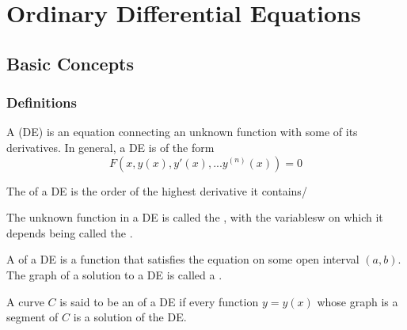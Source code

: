 \documentclass[12pt, a4paper, oneside, openright, titlepage]{book}
\begin{document}
\tableofcontents








\part{Ordinary Differential Equations}

\chapter{Basic Concepts}


\section{Definitions}

\begin{defn}
        A  (DE) is an equation connecting an unknown function with some of its derivatives. In general, a DE is of the form \begin{equation}
                F(x,y(x),y'(x),...y^{(n)}(x)) = 0
        \end{equation}
\end{defn}


\begin{defn}[Order]
        The  of a DE is the order of the highest derivative it contains/
\end{defn}



\begin{defn}
        The unknown function in a DE is called the , with the variablesw on which it depends being called the .
\end{defn}



\begin{defn}[Solution]
        A  of a DE is a function that satisfies the equation on some open interval $(a,b)$. The graph of a solution to a DE is called a .
\end{defn}





\begin{defn}[Graphs]
        A curve $C$ is said to be an  of a DE if every function $y = y(x)$ whose graph is a segment of $C$ is a solution of the DE.
\end{defn}
\end{document}
